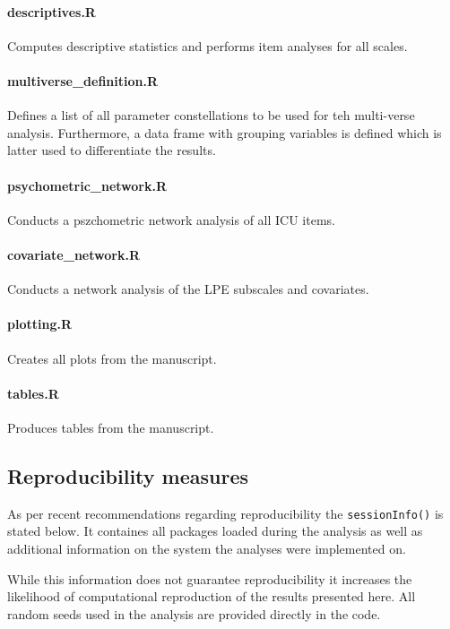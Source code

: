 \documentclass[a4paper,12pt]{article} %
\begin{document}
{\paragraph{descriptives.R}
Computes descriptive statistics and performs item analyses for all scales.

\paragraph{multiverse\_definition.R}
Defines a list of all parameter constellations to be used for teh multi-verse analysis.
Furthermore, a data frame with grouping variables is defined which is latter used to 	differentiate the results.

\paragraph{psychometric\_network.R}
Conducts a pszchometric network analysis of all ICU items.

\paragraph{covariate\_network.R}
Conducts a network analysis of the LPE subscales and covariates.

\paragraph{plotting.R}
Creates all plots from the manuscript.

\paragraph{tables.R}
Produces tables from the manuscript.

\subsection{Reproducibility measures}
As per recent recommendations regarding reproducibility  \parencite{marwick_packaging_2018} the \texttt{sessionInfo()}
is stated below. It containes all packages loaded during the analysis as well as additional information on the system the analyses were implemented on.

While this information does not guarantee reproducibility it increases the likelihood of computational reproduction of the results presented here.
All random seeds used in the analysis are provided directly in the code.

}
\end{document}
